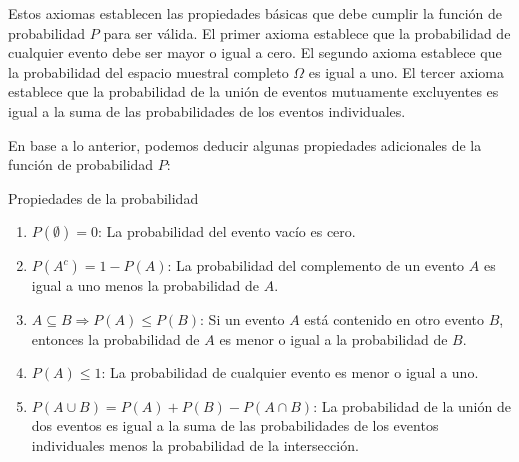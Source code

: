 Estos axiomas establecen las propiedades básicas que debe cumplir la función de probabilidad $P$ para ser válida. El primer axioma establece que la probabilidad de cualquier evento debe ser mayor o igual a cero. El segundo axioma establece que la probabilidad del espacio muestral completo $\Omega$ es igual a uno. El tercer axioma establece que la probabilidad de la unión de eventos mutuamente excluyentes es igual a la suma de las probabilidades de los eventos individuales.

En base a lo anterior, podemos deducir algunas propiedades adicionales de la función de probabilidad $P$:

\begin{definicion}{Propiedades de la probabilidad}
\begin{enumerate}
    \item $P(\emptyset) = 0$:
    La probabilidad del evento vacío es cero.

    \item $P(A^c) = 1 - P(A)$:
    La probabilidad del complemento de un evento $A$ es igual a uno menos la probabilidad de $A$.

    \item $A \subseteq B \Rightarrow P(A) \leq P(B)$:
    Si un evento $A$ está contenido en otro evento $B$,
    entonces la probabilidad de $A$ es menor o igual a la probabilidad de $B$.

    \item $P(A) \leq 1$:
    La probabilidad de cualquier evento es menor o igual a uno.

    \item $P(A \cup B) = P(A) + P(B) - P(A \cap B)$:
    La probabilidad de la unión de dos eventos es igual a la suma de las probabilidades de los eventos individuales menos la probabilidad de la intersección.
\end{enumerate}
\end{definicion}

